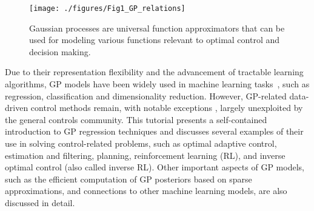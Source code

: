\documentclass[letterpaper,12pt,peerreviewca,draftcls]{IEEEtran}
\newcommand{\XX}[1]{{\bf \color{orange}{ XX #1 XX}}}
\newcommand{\mX}[1]{\added[id=ml,remark={}]{#1}}
\newcommand{\bX}[1]{\added[id=bc,remark={}]{#1}}
\begin{document}
\begin{figure}[t]
\centering
\texttt{[image: ./figures/Fig1\_GP\_relations]}
\caption{Gaussian processes are universal function approximators that can be used for modeling various functions relevant to optimal control and decision making.}
\label{fig:gp_applications}
\end{figure}

Due to their representation flexibility and the advancement of tractable learning algorithms, %
GP models have been widely used in machine learning tasks~\cite{Rasmussen:2005, lawrence2005probabilistic}, such as regression, classification and dimensionality reduction. %
However, GP-related data-driven control methods remain, with notable exceptions \cite{Murray-Smith:02,Murray-Smith:03,ko2007IROS,deisenroth2009gaussian,deisenroth2013gaussian,deisenroth2015gaussian,nguyen2008local}, largely unexploited by the general controls community. This tutorial presents a self-contained introduction to GP regression techniques and discusses several examples of their use in solving control-related problems, such as optimal adaptive control, estimation and filtering, planning, reinforcement learning (RL), and inverse optimal control (also called inverse RL). Other important aspects of GP models, such as the efficient computation of GP posteriors based on sparse approximations, and connections to other machine learning models, are also discussed in detail.   
\end{document}
